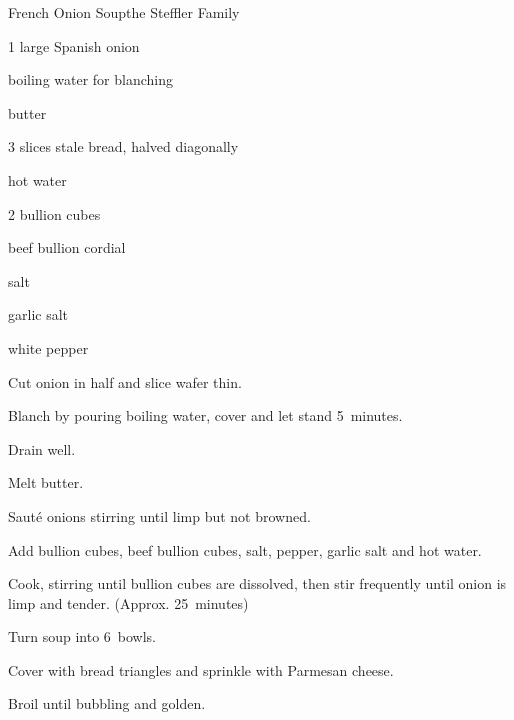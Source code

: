 \begin{recipe}{French Onion Soup}{the Steffler Family}{}

\begin{ingredients}
\item 1 large Spanish onion
\item boiling water for blanching
\item \C{\quarter} butter
\item 3 slices stale bread, halved diagonally
\item {} hot water
\item 2 bullion cubes
\item \C{\quarter} beef bullion cordial
\item {} salt
\item \tp{\eighth} garlic salt
\item \tp{\eighth} white pepper
\item \C{\half} 
\end{ingredients}

\begin{directions}
\item Cut onion in half and slice wafer thin.
\item Blanch by pouring boiling water, cover and let stand 5~minutes.
\item Drain well.
\item Melt butter.
\item Saut\'e onions stirring until limp but not browned.
\item Add bullion cubes, beef bullion cubes, salt, pepper, garlic salt and hot water.
\item Cook, stirring until bullion cubes are dissolved, then stir frequently until onion is limp and tender. (Approx. 25~minutes)
\item Turn soup into 6~bowls.
\item Cover with bread triangles and sprinkle with Parmesan cheese.
\item Broil until bubbling and golden.
\end{directions}
\end{recipe}
